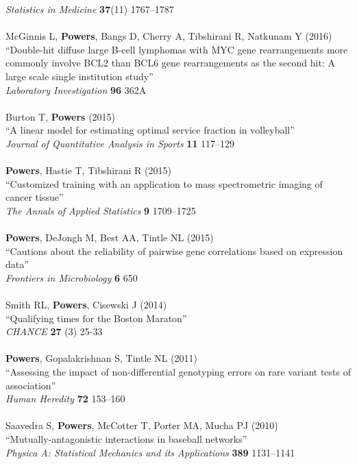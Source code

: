 \documentclass{article}
\begin{document}
{\it Statistics in Medicine} {\bf 37}(11) 1767--1787\\
~\\
McGinnis L, {\bf Powers}, Bangs D, Cherry A, Tibshirani R, Natkunam Y (2016)\\
``Double-hit diffuse large B-cell lymphomas with MYC gene rearrangements more commonly involve BCL2 than BCL6 gene rearrangements as the second hit: A large scale single institution study''\\
{\it Laboratory Investigation} {\bf 96} 362A\\
~\\
Burton T, {\bf Powers} (2015)\\
``A linear model for estimating optimal service fraction in volleyball''\\
{\it Journal of Quantitative Analysis in Sports} {\bf 11} 117--129\\
~\\
{\bf Powers}, Hastie T, Tibshirani R (2015)\\
``Customized training with an application to mass spectrometric imaging of cancer tissue''\\
{\it The Annals of Applied Statistics} {\bf 9} 1709--1725\\
~\\
{\bf Powers}, DeJongh M, Best AA, Tintle NL (2015)\\
``Cautions about the reliability of pairwise gene correlations based on expression data''\\
{\it Frontiers in Microbiology} {\bf 6} 650\\
~\\
Smith RL, \textbf{Powers}, Cisewski J (2014)\\
``Qualifying times for the Boston Maraton''\\
\textit{CHANCE} \textbf{27} (3) 25-33\\
~\\
{\bf Powers}, Gopalakrishnan S, Tintle NL (2011)\\
``Assessing the impact of non-differential genotyping errors on rare variant tests of association''\\
{\it Human Heredity} {\bf 72} 153--160\\
~\\
Saavedra S, {\bf Powers}, McCotter T, Porter MA, Mucha PJ (2010)\\
``Mutually-antagonistic interactions in baseball networks''\\
{\it Physica A: Statistical Mechanics and its Applications} {\bf 389} 1131--1141
\end{document}
